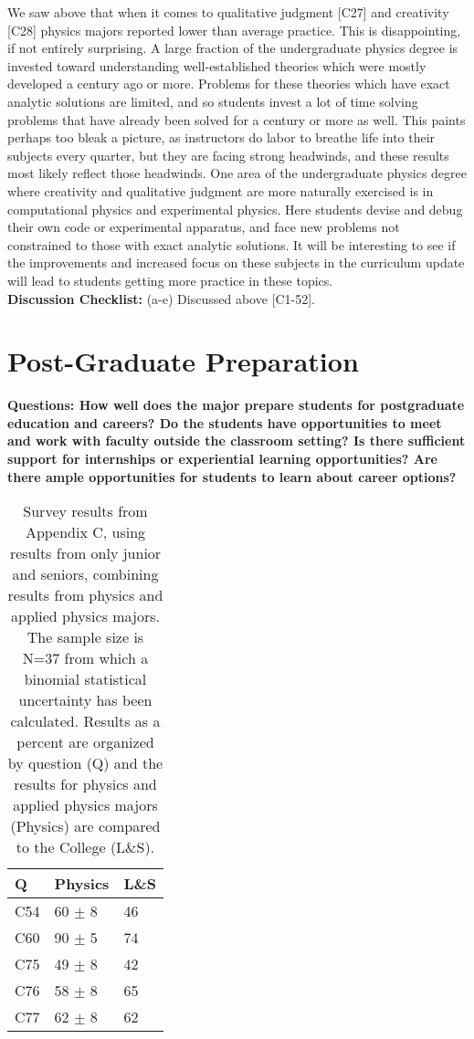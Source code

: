 \documentclass[12pt]{article}
\begin{document}
We saw above that when it comes to qualitative judgment [C27] and
creativity [C28] physics majors reported lower than average practice.
This is disappointing, if not entirely surprising.  A large fraction
of the undergraduate physics degree is invested toward understanding
well-established theories which were mostly developed a century ago or
more.  Problems for these theories which have exact analytic solutions
are limited, and so students invest a lot of time solving problems
that have already been solved for a century or more as well.  This
paints perhaps too bleak a picture, as instructors do labor to breathe
life into their subjects every quarter, but they are facing strong
headwinds, and these results most likely reflect those headwinds.  One
area of the undergraduate physics degree where creativity and
qualitative judgment are more naturally exercised is in computational
physics and experimental physics.  Here students devise and debug
their own code or experimental apparatus, and face new problems not
constrained to those with exact analytic solutions.  It will be
interesting to see if the improvements and increased focus on these
subjects in the curriculum update will lead to students getting more
practice in these topics.\\[3pt]

\noindent
{\bf Discussion Checklist:} (a-e) Discussed above [C1-52].

\newpage
\section{Post-Graduate Preparation}
\label{sec:preparation}
{\bf Questions: How well does the major prepare students for
  postgraduate education and careers?  Do the students have
  opportunities to meet and work with faculty outside the classroom
  setting? Is there sufficient support for internships or experiential
  learning opportunities?  Are there ample opportunities for students
  to learn about career options?}

\begin{table}[htbp]
\caption{\label{tbl:appcii} Survey results from Appendix C, using
  results from only junior and seniors, combining results from physics
  and applied physics majors. The sample size is N=37 from which a
  binomial statistical uncertainty has been calculated.  Results as a
  percent are organized by question (Q) and the results for physics
  and applied physics majors (Physics) are compared to the College
  (L\&S).}
\begin{center}
\begin{tabular}{|lll|}
\hline
Q & Physics & L\&S \\
\hline
C54 & 60 $\pm$ 8 & 46 \\ 
C60 & 90 $\pm$ 5 & 74 \\
C75 & 49 $\pm$ 8 & 42 \\ 
C76 & 58 $\pm$ 8 & 65 \\ 
C77 & 62 $\pm$ 8 & 62 \\ 
\hline 
\end{tabular}
\end{center}
\end{table}
\end{document}
